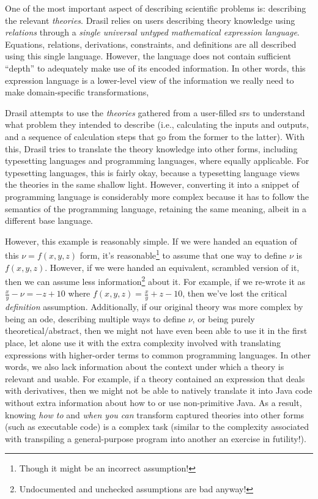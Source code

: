 One of the most important aspect of describing scientific problems is:
describing the relevant \textit{theories}. Drasil relies on users describing
theory knowledge using \textit{relations} through a \textit{single universal
      untyped mathematical expression language}. Equations, relations, derivations,
constraints, and definitions are all described using this single language.
However, the language does not contain sufficient ``depth'' to adequately make
use of its encoded information. In other words, this expression language is a
lower-level view of the information we really need to make domain-specific
transformations,

Drasil attempts to use the \textit{theories} gathered from a user-filled
\acs{srs} to understand what problem they intended to describe (i.e.,
calculating the inputs and outputs, and a sequence of calculation steps that go
from the former to the latter). With this, Drasil tries to translate the theory
knowledge into other forms, including typesetting languages and programming
languages, where equally applicable. For typesetting languages, this is fairly
okay, because a typesetting language views the theories in the same shallow
light. However, converting it into a snippet of programming language is
considerably more complex because it has to follow the semantics of the
programming language, retaining the same meaning, albeit in a different base
language.


However, this example is reasonably simple. If we were handed an equation of
this \(\nu{} = f(x,y,z)\) form, it's reasonable\footnote{Though it might be an
      incorrect assumption!} to assume that one way to define \(\nu{}\) is
\(f(x,y,z)\). However, if we were handed an equivalent, scrambled version of it,
then we can assume less information\footnote{Undocumented and unchecked
      assumptions are bad anyway!} about it. For example, if we re-wrote it as
\(\frac{x}{y} - \nu{} = - z + 10\) where \(f(x,y,z) = \frac{x}{y} + z - 10\),
then we've lost the critical \textit{definition} assumption. Additionally, if
our original theory was more complex by being an \acs{ode}, describing multiple
ways to define \(\nu{}\), or being purely theoretical/abstract, then we might
not have even been able to use it in the first place, let alone use it with the
extra complexity involved with translating expressions with higher-order terms
to common programming languages. In other words, we also lack information about
the context under which a theory is relevant and usable. For example, if a
theory contained an expression that deals with derivatives, then we might not be
able to natively translate it into Java code without extra information about how
to or use non-primitive Java. As a result, knowing \textit{how to} and
\textit{when you can} transform captured theories into other forms (such as
executable code) is a complex task (similar to the complexity associated with
transpiling a general-purpose program into another \textemdash{} an exercise in
futility!).

